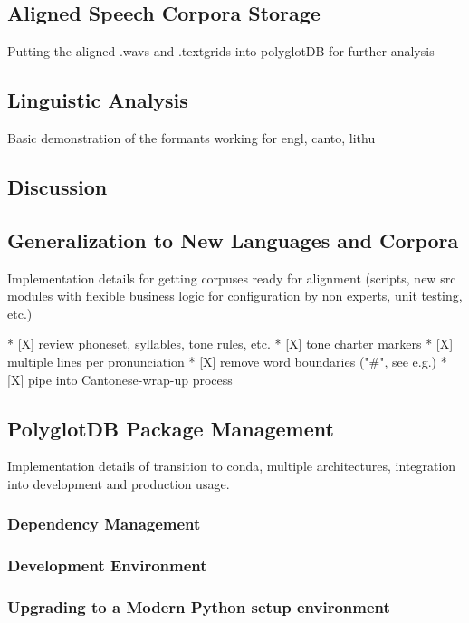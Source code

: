 \documentclass[11pt]{article}
\begin{document}
\subsection{Aligned Speech Corpora Storage}

Putting the aligned .wavs and .textgrids into polyglotDB for further analysis

\subsection{Linguistic Analysis}

Basic demonstration of the formants working for engl, canto, lithu

\subsection{Discussion}

\subsection{Generalization to New Languages and Corpora}

Implementation details for getting corpuses ready for alignment (scripts, new src modules with flexible business logic for configuration by non experts, unit testing, etc.)

    * [X] review phoneset, syllables, tone rules, etc.
    * [X] tone charter markers
    * [X] multiple lines per pronunciation
    * [X] remove word boundaries ("\#", see e.g.)
    * [X] pipe into Cantonese-wrap-up process

\subsection{PolyglotDB Package Management}

Implementation details of transition to conda, multiple architectures, integration into development and production usage.

\subsubsection{Dependency Management}
\subsubsection{Development Environment}
\subsubsection{Upgrading to a Modern Python setup environment}
\end{document}
